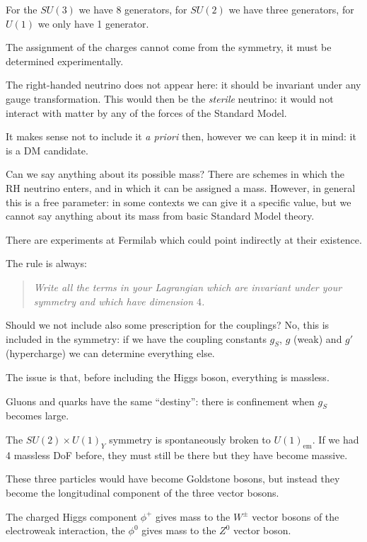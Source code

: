 \documentclass[main.tex]{subfiles}
\begin{document}
For the \(SU(3)\) we have 8 generators, for \(SU(2)\) we have three generators, for \(U(1)\) we only have 1 generator.

The assignment of the charges cannot come from the symmetry, it must be determined experimentally.

The right-handed neutrino does not appear here: it should be invariant under any gauge transformation. This would then be the \emph{sterile} neutrino: it would not interact with matter by any of the forces of the Standard Model.

It makes sense not to include it \emph{a priori} then, however we can keep it in mind: it is a DM candidate.

Can we say anything about its possible mass? There are schemes in which the RH neutrino enters, and in which it can be assigned a mass. However, in general this is a free parameter: in some contexts we can give it a specific value, but we cannot say anything about its mass from basic Standard Model theory.

There are experiments at Fermilab which could point indirectly at their existence.

The rule is always: 
\begin{quote}
    \emph{Write all the terms in your Lagrangian which are invariant under your symmetry and which have dimension \( 4\).}
\end{quote}

Should we not include also some prescription for the couplings? 
No, this is included in the symmetry: if we have the coupling constants \(g_S\), \(g\) (weak) and \(g'\) (hypercharge) we can determine everything else.

The issue is that, before including the Higgs boson, everything is massless.

Gluons and quarks have the same ``destiny'': there is confinement when \(g_S\) becomes large.

The \(SU(2) \times U(1)_{Y}\) symmetry is spontaneously broken to \(U(1)_{\text{em}}\). If we had 4 massless DoF before, they must still be there but they have become massive.

These three particles would have become Goldstone bosons, but instead they become the longitudinal component of the three vector bosons.

The charged Higgs component \(\phi^{+}\) gives mass to the \(W^{\pm}\) vector bosons of the electroweak interaction, the \(\phi^{0}\) gives mass to the \(Z^{0}\) vector boson. 
\end{document}
